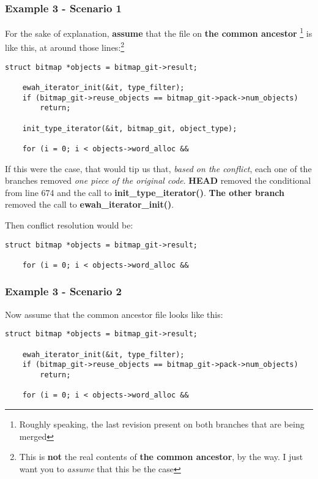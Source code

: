 \subsubsection{Example 3 - Scenario 1}
For the sake of explanation, {\bf assume} that the file on {\bf the common ancestor} \footnote{Roughly speaking, the last revision
present on both branches that are being merged} is like this, at around those lines:\footnote{This is {\bf not} the real contents
of {\bf the common ancestor}, by the way. I just want you to {\it assume} that this be the case}

\begin{lstlisting}[style=c_style, firstnumber=671, caption={\bf example 3} - Scenario 1 - common ancestor code]
	struct bitmap *objects = bitmap_git->result;

	ewah_iterator_init(&it, type_filter);
	if (bitmap_git->reuse_objects == bitmap_git->pack->num_objects)
		return;

	init_type_iterator(&it, bitmap_git, object_type);

	for (i = 0; i < objects->word_alloc &&
\end{lstlisting}

If this were the case, that would tip us that, {\it based on the conflict}, each one of the branches removed {\it one piece of 
the original code}. {\bf HEAD} removed the conditional from line 674 and the call to {\bf init\_type\_iterator()}. {\bf The
other branch} removed the call to {\bf ewah\_iterator\_init()}.

Then conflict resolution would be:
\begin{lstlisting}[style=c_style, firstnumber=671, caption={\bf example 3} - Scenario 1 - conflict resolution]
	struct bitmap *objects = bitmap_git->result;

	for (i = 0; i < objects->word_alloc &&
\end{lstlisting}

\subsubsection{Example 3 - Scenario 2}
Now assume that the common ancestor file looks like this:

\begin{lstlisting}[style=c_style, firstnumber=671, caption={\bf example 3} - Scenario 2 - common ancestor code]
	struct bitmap *objects = bitmap_git->result;

	ewah_iterator_init(&it, type_filter);
	if (bitmap_git->reuse_objects == bitmap_git->pack->num_objects)
		return;

	for (i = 0; i < objects->word_alloc &&
\end{lstlisting}

